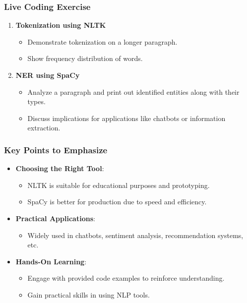 \documentclass{beamer}
\begin{document}
\begin{frame}
    \frametitle{Live Coding Exercise}
    \begin{enumerate}
        \item \textbf{Tokenization using NLTK}
            \begin{itemize}
                \item Demonstrate tokenization on a longer paragraph.
                \item Show frequency distribution of words.
            \end{itemize}
        \item \textbf{NER using SpaCy}
            \begin{itemize}
                \item Analyze a paragraph and print out identified entities along with their types.
                \item Discuss implications for applications like chatbots or information extraction.
            \end{itemize}
    \end{enumerate}
\end{frame}

\begin{frame}
    \frametitle{Key Points to Emphasize}
    \begin{itemize}
        \item \textbf{Choosing the Right Tool}:
            \begin{itemize}
                \item NLTK is suitable for educational purposes and prototyping.
                \item SpaCy is better for production due to speed and efficiency.
            \end{itemize}
        \item \textbf{Practical Applications}:
            \begin{itemize}
                \item Widely used in chatbots, sentiment analysis, recommendation systems, etc.
            \end{itemize}
        \item \textbf{Hands-On Learning}:
            \begin{itemize}
                \item Engage with provided code examples to reinforce understanding.
                \item Gain practical skills in using NLP tools.
            \end{itemize}
    \end{itemize}
\end{frame}
\end{document}
